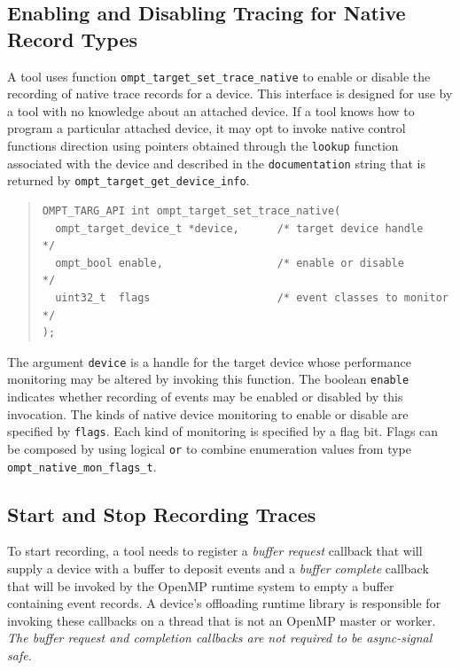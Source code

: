 \documentclass{article}
\begin{document}
\subsection{Enabling and Disabling Tracing for Native Record Types}
\label{sec:trace-event-native}
A tool uses function \verb|ompt_target_set_trace_native| to enable or disable the recording of native trace records for a device. This interface is designed for use by a tool with no 
knowledge about an attached device. If a tool knows how to program a particular attached device, it may opt to invoke native control functions direction using pointers obtained through the \verb|lookup| function associated with the device and described in the \verb|documentation| string that is returned by \verb|ompt_target_get_device_info|.

\begin{quote}
\begin{verbatim}
OMPT_TARG_API int ompt_target_set_trace_native(
  ompt_target_device_t *device,      /* target device handle            */
  ompt_bool enable,                  /* enable or disable               */
  uint32_t  flags                    /* event classes to monitor        */
);
\end{verbatim}
\end{quote}
The argument \verb|device| is a handle for the target device whose performance monitoring may be altered by invoking this function. 
The boolean \verb|enable| indicates whether recording of events may be enabled or disabled by this invocation.
The kinds of native device monitoring to enable or disable are specified by \verb|flags|. Each kind of monitoring is specified by a flag bit. Flags can be composed by using logical {\tt or}  to combine enumeration values from type \verb|ompt_native_mon_flags_t|.


\subsection{Start and Stop Recording Traces}
\label{sec:start-stop-recording}

To start recording, a tool needs to register a \emph{buffer request} callback that will supply a device with a buffer to deposit events and a \emph{buffer complete} callback that will be invoked by the OpenMP runtime system to empty a buffer containing event records. A device's offloading runtime library is responsible for invoking these callbacks on a thread that is not an OpenMP master or worker. {\em The buffer request and completion callbacks are not required to  be async-signal safe.}
\end{document}
